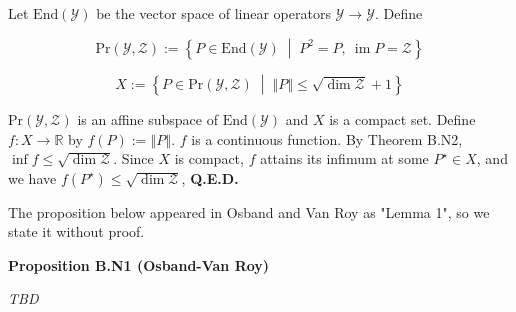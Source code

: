 \documentclass[a4paper]{article}
\newcommand{\Co}[1]{}
\DeclareMathOperator{\Supp}{supp}
\newcommand{\AP}[1]{\left(#1\right)}
\newcommand{\ACM}[2]{\left\{#1\;\middle\vert\;#2\right\}}
\newcommand{\E}[1]{\underset{#1}{\operatorname{E}}}
\newcommand{\D}{\mathrm{d}}
\newcommand{\Nats}{\mathbb{N}}
\newcommand{\Reals}{\mathbb{R}}
\newcommand{\End}{\mathrm{End}}
\DeclareMathOperator{\Img}{im}
\newcommand{\Abs}[1]{\left\vert #1 \right\vert}
\newcommand{\Norm}[1]{\left\Vert #1 \right\Vert}
\newcommand{\K}{\xrightarrow{\mathrm{k}}}
\newcommand{\Y}{\mathcal{Y}}
\newcommand{\Z}{\mathcal{Z}}
\newcommand{\A}{\mathcal{A}}
\newcommand{\V}{\mathrm{V}}
\newcommand{\EU}{\mathrm{EU}}
\begin{document}
Let $\End(\Y)$ be the vector space of linear operators $\Y\rightarrow\Y$. Define

$$\mathrm{Pr}(\Y,\Z):=\ACM{P\in\End(\Y)}{P^2=P,\ \Img{P}=\Z}$$

$$X:=\ACM{P\in\mathrm{Pr}(\Y,\Z)}{\Norm{P}\leq\sqrt{\dim{\Z}}+1}$$

$\mathrm{Pr}(\Y,\Z)$ is an affine subspace of $\End(\Y)$ and $X$ is a compact set. Define $f:X\rightarrow\Reals$ by $f(P):=\Norm{P}$. $f$ is a continuous function. By Theorem B.N2, $\inf f \leq \sqrt{\dim\Z}$. Since $X$ is compact, $f$ attains its infimum at some $P^\star\in X$, and we have $f\AP{P^\star} \leq \sqrt{\dim\Z}$, \textbf{Q.E.D.}\Co{b}


The proposition below appeared in Osband and Van Roy as "Lemma 1", so we state it without proof.

\textbf{Proposition B.N1 (Osband-Van Roy)}\Co{b}

\textit{TBD}\Co{i}

\Co{...

\textbf{Proposition B.N3}\Co{b}

Consider some $\gamma\in(0,1)$, $\tau\in(0,\infty)$, $T\in\Nats^+$, a universe..., some $\pi^*: ? \rightarrow \A$ and some $\pi^0: ? \K \A$. Assume that $\gamma \geq \gamma_M$. For any $n \in \Nats$, let $\pi^*_n$ be a policy s.t. for any $h \in ?$

$$\pi^*_n(h):=\begin{cases} \pi^0(h) \text{ if } \Abs{h} < nT \\ \pi^*(h) \text{ otherwise} \end{cases}$$

Assume that for any $h \in ?$

i. $$\pi^*(s) \in \A_{M}^\omega\AP{S(h)}$$

ii. $$\Supp{\pi^0(h)} \subseteq \A_{M}^0\AP{S(h)}$$

iii. For any $\theta\in(\gamma,1)$ $$\Abs{\frac{\D\V_{M}\AP{S(h),\theta}}{\D\theta}} \leq \tau$$

Then

$$\EU^{*}_\upsilon(\gamma)-\EU^{\pi^0}_\upsilon(\gamma) \leq (1-\gamma)\sum_{n=0}^\infty \sum_{m=0}^{T-1} \gamma^{nT+m}\left(\E{x\sim\mu\bowtie\pi^*_n}\left[r\left(x_{:nT+m}\right)\right]-\E{x\sim\mu\bowtie\pi^0}\left[r\left(x_{:nT+m}\right)\right]\right) + \frac{2\tau\gamma^T(1-\gamma)}{1-\gamma^T}$$}
\end{document}

